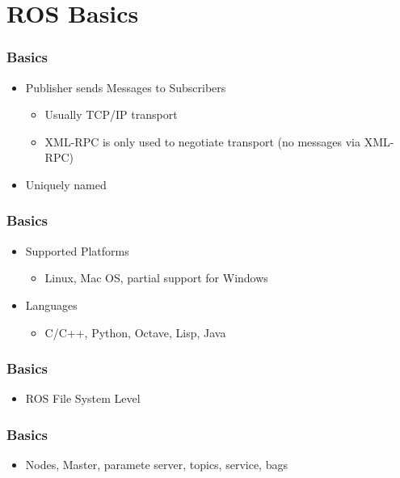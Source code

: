 \documentclass[t]{beamer}
\begin{document}
\section{ROS Basics}

\begin{frame}
\frametitle{Basics}
\begin{itemize}
  \item Publisher sends Messages to Subscribers
  \begin{itemize}
    \item Usually TCP/IP transport
    \item XML-RPC is only used to negotiate transport (no messages via XML-RPC)
  \end{itemize}
  \item Uniquely named
\end{itemize}
\end{frame}

\begin{frame}
\frametitle{Basics}
\begin{itemize}
  \item Supported Platforms
  \begin{itemize}
    \item Linux, Mac OS, partial support for Windows
  \end{itemize}
  \item Languages
  \begin{itemize}
    \item C/C++, Python, Octave, Lisp, Java
  \end{itemize}

\end{itemize}
\end{frame}

\begin{frame}
\frametitle{Basics}
\begin{itemize}
  \item ROS File System Level
\end{itemize}
\end{frame}

\begin{frame}
\frametitle{Basics}
\begin{itemize}
  \item Nodes, Master, paramete server, topics, service, bags
\end{itemize}
\end{frame}
\end{document}
